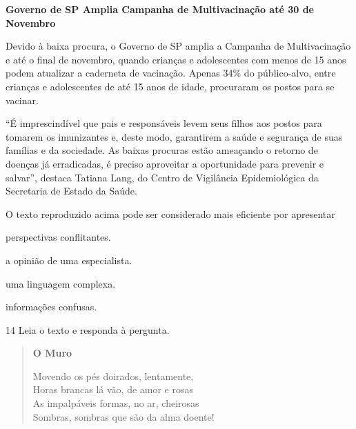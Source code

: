 \begin{myquote}
\textbf{Governo de SP Amplia Campanha de Multivacinação até 30 de Novembro}

Devido à baixa procura, o Governo de SP amplia a Campanha de
Multivacinação e até o final de novembro, quando crianças e adolescentes
com menos de 15 anos podem atualizar a caderneta de vacinação. Apenas
34\% do público-alvo, entre crianças e adolescentes de até 15 anos de
idade, procuraram os postos para se vacinar.

``É imprescindível que pais e responsáveis levem seus filhos aos postos
para tomarem os imunizantes e, deste modo, garantirem a saúde e
segurança de suas famílias e da sociedade. As baixas procuras estão
ameaçando o retorno de doenças já erradicadas, é preciso aproveitar a
oportunidade para prevenir e salvar'', destaca Tatiana Lang, do Centro de
Vigilância Epidemiológica da Secretaria de Estado da Saúde.

\end{myquote}

O texto reproduzido acima pode ser considerado mais eficiente por
apresentar

\begin{multicols}{2}
\begin{escolha}
  \item perspectivas conflitantes.

  \item a opinião de uma especialista.

  \item uma linguagem complexa.

  \item informações confusas.
\end{escolha}
\end{multicols}

\num{14} Leia o texto e responda à pergunta.
\enlargethispage{2\baselineskip}

\begin{myquote}
\begin{verse}
\textbf{O Muro}

Movendo os pés doirados, lentamente,\\
Horas brancas lá vão, de amor e rosas\\
As impalpáveis formas, no ar, cheirosas\\
Sombras, sombras que são da alma doente!
\end{verse}

\end{myquote}

